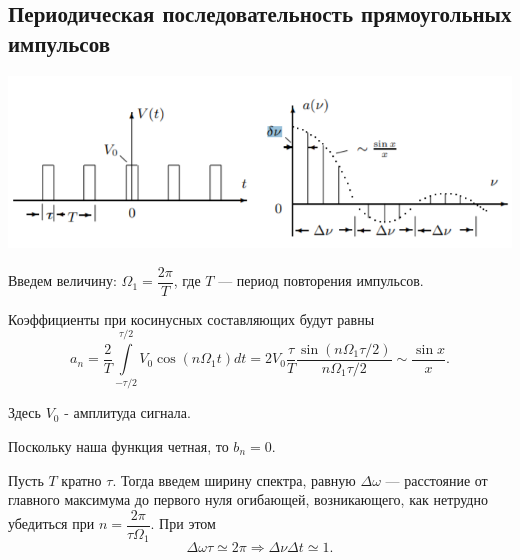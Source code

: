 \documentclass[a4paper,12pt]{article}
\begin{document}
\subsection*{Периодическая последовательность прямоугольных импульсов}
\begin{center}
\includegraphics[scale=0.9]{2.png}
\end{center}
Введем величину: $\Omega_1 = \dfrac{2\pi}{T}$,
где $T$ --- период повторения импульсов.

Коэффициенты при косинусных составляющих будут равны
\begin{equation}
a_n = \dfrac{2}{T}\int\limits_{-\tau/2}^{\tau/2}V_0\cos\left(n\Omega_1 t\right)dt = 2V_0\dfrac{\tau}{T}\dfrac{\sin\left(n\Omega_1\tau/2\right)}{n\Omega_1\tau/2} \sim \dfrac{\sin x}{x}.
\end{equation}

Здесь $V_0$ - амплитуда сигнала.

Поскольку наша функция четная, то $b_n = 0$. 

Пусть $T$ кратно $\tau$. Тогда введем ширину спектра, равную $\Delta \omega$ --- расстояние от главного максимума до первого нуля огибающей, возникающего, как нетрудно убедиться при $n = \dfrac{2\pi}{\tau \Omega_1}$. При 
этом
\begin{equation}
\Delta \omega \tau \simeq 2\pi \Rightarrow \Delta \nu \Delta t \simeq 1.
\end{equation}
\end{document}
